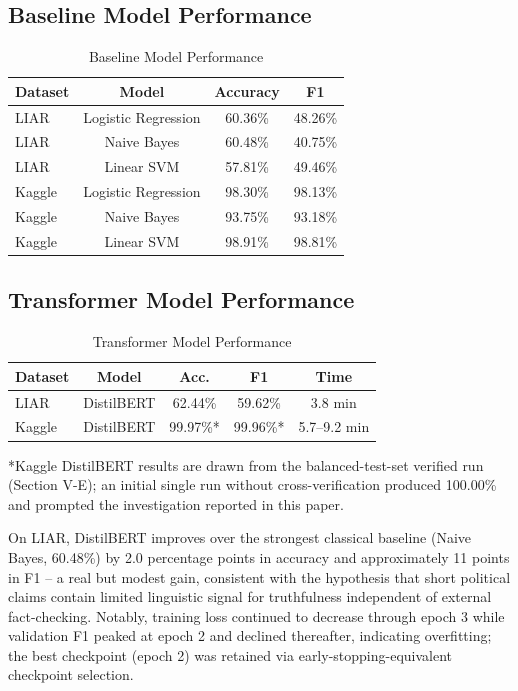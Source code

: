 \documentclass[conference]{IEEEtran}
\begin{document}
\subsection{Baseline Model Performance}
\begin{table}[!t]
\caption{Baseline Model Performance}
\centering
\begin{tabular}{lccc}
\toprule
Dataset & Model & Accuracy & F1 \\
\midrule
LIAR & Logistic Regression & 60.36\% & 48.26\% \\
LIAR & Naive Bayes & 60.48\% & 40.75\% \\
LIAR & Linear SVM & 57.81\% & 49.46\% \\
Kaggle & Logistic Regression & 98.30\% & 98.13\% \\
Kaggle & Naive Bayes & 93.75\% & 93.18\% \\
Kaggle & Linear SVM & 98.91\% & 98.81\% \\
\bottomrule
\end{tabular}
\end{table}

\subsection{Transformer Model Performance}
\begin{table}[!t]
\caption{Transformer Model Performance}
\centering
\begin{tabular}{lcccc}
\toprule
Dataset & Model & Acc. & F1 & Time \\
\midrule
LIAR & DistilBERT & 62.44\% & 59.62\% & 3.8 min \\
Kaggle & DistilBERT & 99.97\%* & 99.96\%* & 5.7--9.2 min \\
\bottomrule
\end{tabular}
\end{table}
*Kaggle DistilBERT results are drawn from the balanced-test-set verified run (Section V-E); an initial single run without cross-verification produced 100.00\% and prompted the investigation reported in this paper.

On LIAR, DistilBERT improves over the strongest classical baseline (Naive Bayes, 60.48\%) by 2.0 percentage points in accuracy and approximately 11 points in F1 -- a real but modest gain, consistent with the hypothesis that short political claims contain limited linguistic signal for truthfulness independent of external fact-checking. Notably, training loss continued to decrease through epoch 3 while validation F1 peaked at epoch 2 and declined thereafter, indicating overfitting; the best checkpoint (epoch 2) was retained via early-stopping-equivalent checkpoint selection.
\end{document}

